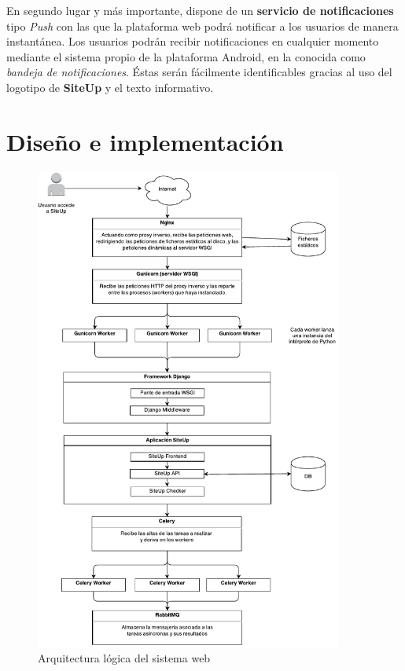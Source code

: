 \documentclass[a4paper,12pt]{article}
\begin{document}
En segundo lugar y más importante, dispone de un \textbf{servicio de
  notificaciones} tipo \textit{Push} con las que la plataforma web podrá
notificar a los usuarios de manera instantánea. Los usuarios podrán recibir
notificaciones en cualquier momento mediante el sistema propio de la plataforma
Android, en la conocida como \textit{bandeja de notificaciones}. Éstas serán
fácilmente identificables gracias al uso del logotipo de \textbf{SiteUp} y el
texto informativo.


\section{Diseño e implementación}

\begin{figure}[htbp]
  \centering
  \includegraphics[width=0.9\textwidth]{diagrama_arquitectura_logica}
  \caption{Arquitectura lógica del sistema web}
  \label{fig:arquitectura-logica}
\end{figure}
\end{document}
